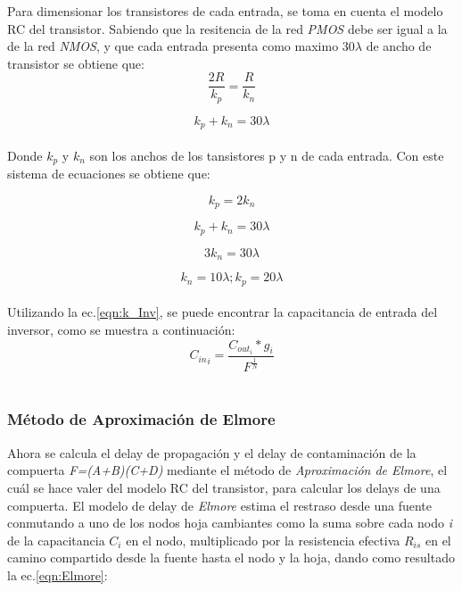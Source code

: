 \documentclass[12pt,a4paper]{article} %
\begin{document}
Para dimensionar los transistores de cada entrada, se toma en cuenta el modelo RC del transistor. Sabiendo que la resitencia de la red \textit{PMOS} debe ser igual a la de la red \textit{NMOS}, y que cada entrada presenta como maximo 30$\lambda$ de ancho de transistor se obtiene que:\\

\begin{equation}\label{eqn:R}
\frac{2R}{k_p} = \frac{R}{k_n}
\end{equation}

\begin{equation}\label{eqn:k}
k_p + k_n = 30\lambda
\end{equation}\\

Donde \textit{$k_{p}$} y \textit{$k_{n}$} son los anchos de los tansistores p y n de cada entrada. Con este sistema de ecuaciones se obtiene que:

\begin{equation}\label{eqn:R1}
k_p = 2k_n
\end{equation}

\begin{equation}\label{eqn:k1}
k_p + k_n = 30\lambda
\end{equation}

\begin{equation}\label{eqn:k2}
3k_n = 30\lambda
\end{equation}

\begin{equation}\label{eqn:k3}
k_n = 10\lambda ; k_p = 20\lambda
\end{equation}\\

Utilizando la ec.\ref{eqn:k_Inv}, se puede encontrar la capacitancia de entrada del inversor, como se muestra a continuación:\\

\begin{equation}\label{eqn:k_Inv}
{C_{in}}_{i}= \frac{C_{out}_{i}*g_{i}}{F^{\frac{1}{N}}}
\end{equation}\\


\subsubsection{Método de Aproximación de Elmore}

Ahora se calcula el delay de propagación y el delay de contaminación de la compuerta \textit{F=(A+B)(C+D)} mediante el método de \textit{Aproximación de Elmore}, el cuál se hace valer del modelo RC del transistor, para calcular los delays de una compuerta. El modelo de delay de \textit{Elmore} estima el restraso desde una fuente conmutando a uno de los nodos hoja cambiantes como la suma sobre cada nodo \textit{i} de la capacitancia \textit{$C_{i}$} en el nodo, multiplicado por la resistencia efectiva \textit{$R_{is}$} en el camino compartido desde la fuente hasta el nodo y la hoja, dando como resultado la ec.\ref{eqn:Elmore}:
\end{document}
